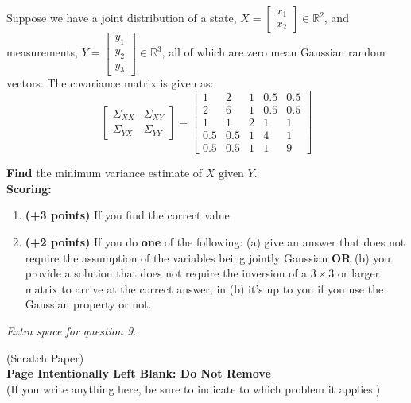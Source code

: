 \documentclass[letterpaper]{article}
\newcommand{\real}{\mathbb R}  %
\begin{document}
Suppose we have a joint distribution of a state,
$X= \begin{bmatrix} x_1 \\ x_2 \end{bmatrix} \in \real^2$,
and measurements, $Y= \begin{bmatrix} y_1 \\ y_2 \\y_3 \end{bmatrix} \in \real^3$, all of which are zero mean Gaussian random vectors. The covariance matrix is given as:\\
$$\begin{bmatrix} \Sigma_{XX} & \Sigma_{XY} \\\Sigma_{YX} & \Sigma_{YY}   \end{bmatrix} = \begin{bmatrix}1 & 2 & 1 & 0.5 & 0.5\\ 2 & 6 & 1 & 0.5 & 0.5\\1 & 1 & 2 & 1 & 1\\
0.5 & 0.5 & 1 & 4 & 1 \\ 0.5 & 0.5 & 1 & 1 &9
\end{bmatrix}  $$

\textbf{Find} the minimum variance estimate of $X$ given $Y$. \\

\textbf{Scoring:}
\begin{enumerate}
	\setlength{\itemsep}{-.1in}
\item \textbf{(+3 points)} If you find the correct value\\
\item \textbf{(+2 points)} If you do \textbf{one} of the following: (a) give an answer that does not require the assumption of the variables being jointly Gaussian \textbf{OR} (b) you provide a solution that does not require the inversion of a $3 \times 3$ or larger matrix to arrive at the correct answer; in (b) it's up to you if you use the Gaussian property or not.
\end{enumerate}

\newpage

\newpage
\textit{Extra space for question 9.}

\newpage
\vspace*{2cm}

\begin{center}
(Scratch Paper)\\
{\bf \LARGE Page Intentionally Left Blank: Do Not Remove}\\
(If you write anything here, be sure to indicate to which problem it applies.)

\end{center}



\end{document}
